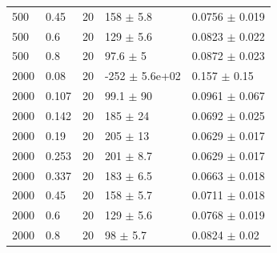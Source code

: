 \begin{tabular}{lllll}
500 & 0.45 & 20 & 158 $\pm$ 5.8 & 0.0756 $\pm$ 0.019 \\
500 & 0.6 & 20 & 129 $\pm$ 5.6 & 0.0823 $\pm$ 0.022 \\
500 & 0.8 & 20 & 97.6 $\pm$ 5 & 0.0872 $\pm$ 0.023 \\
2000 & 0.08 & 20 & -252 $\pm$ 5.6e+02 & 0.157 $\pm$ 0.15 \\
2000 & 0.107 & 20 & 99.1 $\pm$ 90 & 0.0961 $\pm$ 0.067 \\
2000 & 0.142 & 20 & 185 $\pm$ 24 & 0.0692 $\pm$ 0.025 \\
2000 & 0.19 & 20 & 205 $\pm$ 13 & 0.0629 $\pm$ 0.017 \\
2000 & 0.253 & 20 & 201 $\pm$ 8.7 & 0.0629 $\pm$ 0.017 \\
2000 & 0.337 & 20 & 183 $\pm$ 6.5 & 0.0663 $\pm$ 0.018 \\
2000 & 0.45 & 20 & 158 $\pm$ 5.7 & 0.0711 $\pm$ 0.018 \\
2000 & 0.6 & 20 & 129 $\pm$ 5.6 & 0.0768 $\pm$ 0.019 \\
2000 & 0.8 & 20 & 98 $\pm$ 5.7 & 0.0824 $\pm$ 0.02 \\
\bottomrule
\end{tabular}
